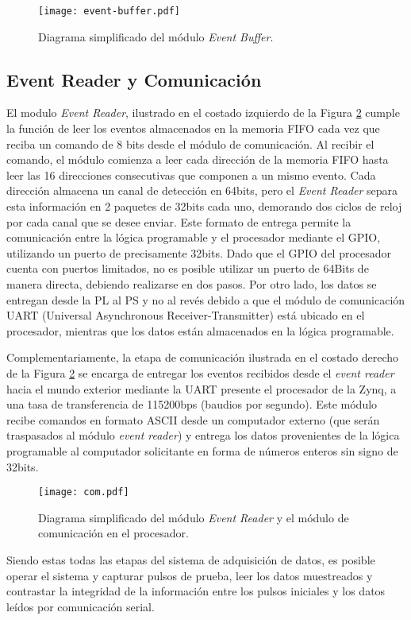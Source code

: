 	\begin{figure}[H]
		\centering
		\texttt{[image: event-buffer.pdf]}
		\caption{Diagrama simplificado del módulo \textit{Event Buffer}.}
		\label{fig:event-buffer}
	\end{figure}
	
	\subsection{Event Reader y Comunicación}
	\label{sec:comm}
	El modulo \textit{Event Reader}, ilustrado en el costado izquierdo de la Figura \ref{fig:com} cumple la función de leer los eventos almacenados en la memoria FIFO cada vez que reciba un comando de 8 bits desde el módulo de comunicación. Al recibir el comando, el módulo comienza a leer cada dirección de la memoria FIFO hasta leer las 16 direcciones consecutivas que componen a un mismo evento. Cada dirección almacena un canal de detección en 64bits, pero el \textit{Event Reader} separa esta información en 2 paquetes de 32bits cada uno, demorando dos ciclos de reloj por cada canal que se desee enviar. Este formato de entrega permite la comunicación entre la lógica programable y el procesador mediante el GPIO, utilizando un puerto de precisamente 32bits. Dado que el GPIO del procesador cuenta con puertos limitados, no es posible utilizar un puerto de 64Bits de manera directa, debiendo realizarse en dos pasos. Por otro lado, los datos se entregan desde la PL al PS y no al revés debido a que el módulo de comunicación UART (Universal Asynchronous Receiver-Transmitter) está ubicado en el procesador, mientras que los datos están almacenados en la lógica programable.
	 
	Complementariamente, la etapa de comunicación ilustrada en el costado derecho de la Figura \ref{fig:com} se encarga de entregar los eventos recibidos desde el \textit{event reader} hacia el mundo exterior mediante la UART presente el procesador de la Zynq, a una tasa de transferencia de 115200bps (baudios por segundo). Este módulo recibe comandos en formato ASCII desde un computador externo (que serán traspasados al módulo \textit{event reader}) y entrega los datos provenientes de la lógica programable al computador solicitante en forma de números enteros sin signo de 32bits.
	
	\begin{figure}[H]
		\centering
		\texttt{[image: com.pdf]}
		\caption{Diagrama simplificado del módulo \textit{Event Reader} y el módulo de comunicación en el procesador.}
		\label{fig:com}
	\end{figure}
	
	Siendo estas todas las etapas del sistema de adquisición de datos, es posible operar el sistema y capturar pulsos de prueba, leer los datos muestreados y contrastar la integridad de la información entre los pulsos iniciales y los datos leídos por comunicación serial.
	
	
	
